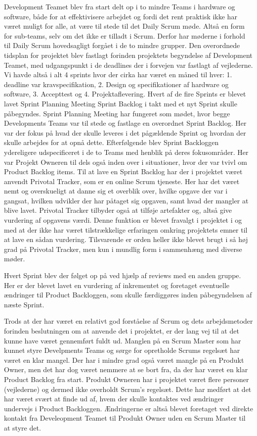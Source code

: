 Development Teamet blev fra start delt op i to mindre Teams i hardware og software, både for at effektivisere arbejdet og fordi det rent praktisk ikke har været muligt for alle, at være til stede til det Daily Scrum møde. Altså en form for sub-teams, selv om det ikke er tilladt i Scrum. Derfor har møderne i forhold til Daily Scrum hovedsagligt forgået i de to mindre grupper. 
Den overordnede tidsplan for projektet blev fastlagt forinden projektets begyndelse af Development Teamet, med udgangspunkt i de deadlines der i forvejen var fastlagt af vejlederne. Vi havde altså i alt 4 sprints hvor der cirka har været en måned til hver: 1. deadline var kravspecifikation, 2. Design og specifikationer af hardware og software, 3. Accepttest og 4. Projektaflevering.
Hvert af de fire Sprints er blevet lavet Sprint Planning Meeting Sprint Backlog i takt med et nyt Sprint skulle påbegyndes.
Sprint Planning Meeting har fungeret som mødet, hvor begge Developments Teams var til stede og fastlage en overordnet Sprint Backlog. Her var der fokus på hvad der skulle leveres i det pågældende Sprint og hvordan der skulle arbejdes for at opnå dette. Efterfølgende blev Sprint Backloggen ydereligere udspecificeret i de to Teams med henblik på deres fokusområder. Her var Projekt Owneren til dels også inden over i situationer, hvor der var tvivl om Product Backlog items.
Til at lave en Sprint Backlog har der i projektet været anvendt Privotal Tracker, som er en online Scrum tjeneste. Her har det været nemt og overskueligt at danne sig et overblik over, hvilke opgave der var i gangsat, hvilken udvikler der har påtaget sig opgaven, samt hvad der mangler at blive lavet.
Privotal Tracker tilbyder også at tilføje artefakter og, altså give vurdering af opgavens værdi. Denne funktion er blevet fravalgt i projektet i og med at der ikke har været tilstrækkelige erfaringen omkring projektets emner til at lave en sådan vurdering.
Tilsvarende er orden heller ikke blevet brugt i så høj grad på Privotal Tracker, men kun i mundlig form i sammenhæng med diverse møder.
  
Hvert Sprint blev der følget op på ved hjælp af reviews med en anden gruppe. Her er der blevet lavet en vurdering af inkrementet og foretaget eventuelle  ændringer til Product Backloggen, som skulle færdiggøres inden påbegyndelsen af næste Sprint.         

Trods at der har været en relativt god forståelse af Scrum og dets arbejdsmetoder forinden beslutningen om at anvende det i projektet, er der lang vej til at det kunne have været gennemført fuldt ud. 
Manglen på en Scrum Master som har kunnet styre Develpments Teams og sørge for opretholde Scrums regelsæt har været en klar mangel. 
Der har i mindre grad også været mangle på en Produkt Owner, men det har dog været nemmere at se bort fra, da der har været en klar Product Backlog fra start. Produkt Owneren har i projektet været flere personer (vejlederne) og dermed ikke overholdt Scrum’s regelsæt. Dette har medført at det har været svært at finde ud af, hvem der skulle kontaktes ved ændringer undervejs i Product Backloggen. Ændringerne er altså blevet foretaget ved direkte kontakt fra Develeopment Teamet til Produkt Owner uden en Scrum Master til at styre det. 


